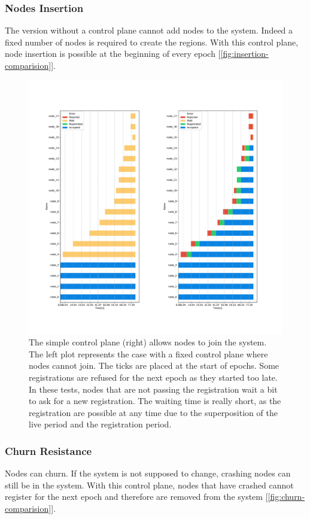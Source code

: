 \documentclass[a4paper,11pt,twoside=semi,openright]{report}
\begin{document}
\subsubsection{Nodes Insertion}
The version without a control plane cannot add nodes to the system. Indeed a
fixed number of nodes is required to create the regions. With this control
plane, node insertion is possible at the beginning of every epoch
[\autoref{fig:insertion-comparision}].

\begin{figure}[!h] 
\centering
\includegraphics[width=450pt]{figures/JoinSubplots}
\caption{The simple control plane (right) allows nodes to join the system. The
    left plot represents the case with a fixed control plane where nodes cannot
    join. The ticks are placed at the start of epochs. Some registrations are
    refused for the next epoch as they started too late. In these tests, nodes
    that are not passing the registration wait a bit to ask for a new
    registration. The waiting time is really short, as the registration are
    possible at any time due to the superposition of the live period and the
    registration period. }
 \label{fig:insertion-comparision}
\end{figure}

\subsubsection{Churn Resistance}
Nodes can churn. If the system is not supposed to change, crashing nodes can still be
in the system. With this control plane, nodes that have crashed cannot
register for the next epoch and therefore are removed from the system [\autoref{fig:churn-comparision}]. 
\end{document}
